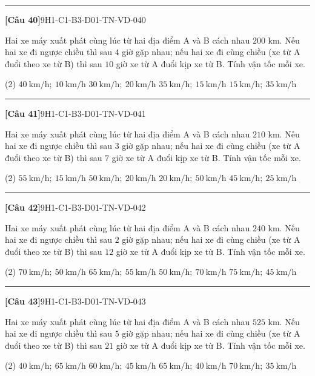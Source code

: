 \documentclass[12pt,a4paper]{article}
\newif\ifloigiai
\newenvironment{cauhoi}[2]{%
  \par\medskip\noindent\rule{\textwidth}{0.4pt}\par\nopagebreak
  \noindent\textbf{[#1]}\hfill{\scriptsize\ttfamily #2}\par\nopagebreak\smallskip}{\par}
\newcommand{\dapan}[1]{\ifloigiai\par\smallskip\noindent\textit{Đáp án:} \textbf{#1}\par\fi}
\begin{document}
\begin{cauhoi}{Câu 40}{9H1-C1-B3-D01-TN-VD-040}
Hai xe máy xuất phát cùng lúc từ hai địa điểm A và B cách nhau $200$ km. Nếu hai xe đi ngược chiều thì sau $4$ giờ gặp nhau; nếu hai xe đi cùng chiều (xe từ A đuổi theo xe từ B) thì sau $10$ giờ xe từ A đuổi kịp xe từ B. Tính vận tốc mỗi xe.
\begin{tasks}(2)
\task $40\ \text{km/h};\ 10\ \text{km/h}$
\task $30\ \text{km/h};\ 20\ \text{km/h}$
\task $35\ \text{km/h};\ 15\ \text{km/h}$
\task $15\ \text{km/h};\ 35\ \text{km/h}$
\end{tasks}
\dapan{C}
\end{cauhoi}
\begin{cauhoi}{Câu 41}{9H1-C1-B3-D01-TN-VD-041}
Hai xe máy xuất phát cùng lúc từ hai địa điểm A và B cách nhau $210$ km. Nếu hai xe đi ngược chiều thì sau $3$ giờ gặp nhau; nếu hai xe đi cùng chiều (xe từ A đuổi theo xe từ B) thì sau $7$ giờ xe từ A đuổi kịp xe từ B. Tính vận tốc mỗi xe.
\begin{tasks}(2)
\task $55\ \text{km/h};\ 15\ \text{km/h}$
\task $50\ \text{km/h};\ 20\ \text{km/h}$
\task $20\ \text{km/h};\ 50\ \text{km/h}$
\task $45\ \text{km/h};\ 25\ \text{km/h}$
\end{tasks}
\dapan{B}
\end{cauhoi}
\begin{cauhoi}{Câu 42}{9H1-C1-B3-D01-TN-VD-042}
Hai xe máy xuất phát cùng lúc từ hai địa điểm A và B cách nhau $240$ km. Nếu hai xe đi ngược chiều thì sau $2$ giờ gặp nhau; nếu hai xe đi cùng chiều (xe từ A đuổi theo xe từ B) thì sau $12$ giờ xe từ A đuổi kịp xe từ B. Tính vận tốc mỗi xe.
\begin{tasks}(2)
\task $70\ \text{km/h};\ 50\ \text{km/h}$
\task $65\ \text{km/h};\ 55\ \text{km/h}$
\task $50\ \text{km/h};\ 70\ \text{km/h}$
\task $75\ \text{km/h};\ 45\ \text{km/h}$
\end{tasks}
\dapan{A}
\end{cauhoi}
\begin{cauhoi}{Câu 43}{9H1-C1-B3-D01-TN-VD-043}
Hai xe máy xuất phát cùng lúc từ hai địa điểm A và B cách nhau $525$ km. Nếu hai xe đi ngược chiều thì sau $5$ giờ gặp nhau; nếu hai xe đi cùng chiều (xe từ A đuổi theo xe từ B) thì sau $21$ giờ xe từ A đuổi kịp xe từ B. Tính vận tốc mỗi xe.
\begin{tasks}(2)
\task $40\ \text{km/h};\ 65\ \text{km/h}$
\task $60\ \text{km/h};\ 45\ \text{km/h}$
\task $65\ \text{km/h};\ 40\ \text{km/h}$
\task $70\ \text{km/h};\ 35\ \text{km/h}$
\end{tasks}
\dapan{C}
\end{cauhoi}
\end{document}
